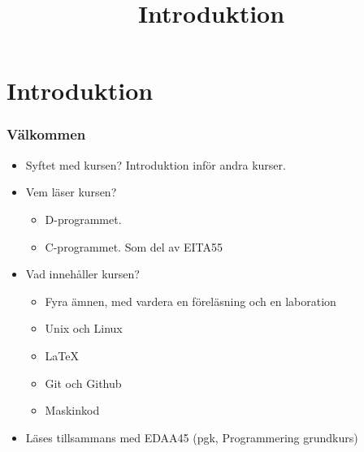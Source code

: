 
\title{Introduktion}
\section{Introduktion}


\begin{frame}[fragile=singleslide]
	\frametitle{Välkommen}
	\begin{itemize}
		\item Syftet med kursen? Introduktion inför andra kurser.
		\item Vem läser kursen?
		      \begin{itemize}
			      \item D-programmet.
			      \item C-programmet. Som del av EITA55
		      \end{itemize}
		\item Vad innehåller kursen?
		      \begin{itemize}
			      \item Fyra ämnen, med vardera en föreläsning och en laboration
			      \item Unix och Linux
			      \item \LaTeX
			      \item Git och Github
			      \item Maskinkod
		      \end{itemize}
		\item Läses tillsammans med EDAA45 (pgk, Programmering grundkurs)
	\end{itemize}
\end{frame}


